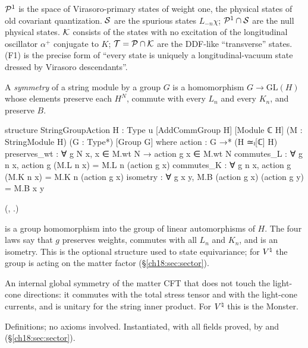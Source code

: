 \begin{physics}
$\mathcal{P}^1$ is the space of Virasoro-primary states of weight one, the physical states of old covariant
quantization.  $\mathcal{S}$ are the spurious states $L_{-n}\chi$; $\mathcal{P}^1\cap\mathcal{S}$ are the null physical states.
$\mathcal{K}$ consists of the states with no excitation of the longitudinal oscillator $\alpha^+$ conjugate to
$K$; $\mathcal{T}=\mathcal{P}\cap\mathcal{K}$ are the DDF-like ``transverse'' states.  (F1) is the precise form of ``every state
is uniquely a longitudinal-vacuum state dressed by Virasoro descendants''.
\end{physics}

\begin{definition}[Symmetries]\label{ch18:def:stringgroup}
A \emph{symmetry} of a string module by a group $G$ is a homomorphism $G\to\mathrm{GL}(H)$ whose
elements preserve each $H^N$, commute with every $L_n$ and every $K_n$, and preserve $B$.
\end{definition}
\begin{leancode}
structure StringGroupAction {H : Type u} [AddCommGroup H] [Module ℂ H]
    (M : StringModule H) (G : Type*) [Group G] where
  action : G →* (H ≃ₗ[ℂ] H)
  preserves_wt : ∀ g N x, x ∈ M.wt N → action g x ∈ M.wt N
  commutes_L : ∀ g n x, action g (M.L n x) = M.L n (action g x)
  commutes_K : ∀ g n x, action g (M.K n x) = M.K n (action g x)
  isometry : ∀ g x y, M.B (action g x) (action g y) = M.B x y
\end{leancode}
(, .)
\begin{dictionary}
 is a group homomorphism into the group of linear automorphisms of $H$.  The
four laws say that $g$ preserves weights, commutes with all $L_n$ and $K_n$, and is an isometry.  This is the optional structure used to state equivariance; for
${V^{\natural}}$ the group is  acting on the matter factor (\S\ref{ch18:sec:sector}).
\end{dictionary}
\begin{physics}
An internal global symmetry of the matter CFT that does not touch the light-cone directions: it
commutes with the total stress tensor and with the light-cone currents, and is unitary for the string
inner product.  For ${V^{\natural}}$ this is the Monster.
\end{physics}
\begin{status}
Definitions; no axioms involved.  Instantiated, with all fields proved, by  and
 (\S\ref{ch18:sec:sector}).
\end{status}


